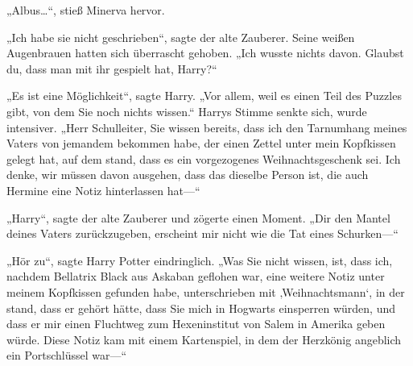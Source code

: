 „Albus…“, stieß Minerva hervor.

„Ich habe sie nicht geschrieben“, sagte der alte Zauberer. Seine weißen Augenbrauen hatten sich überrascht gehoben.
„Ich wusste nichts davon. Glaubst du, dass man mit ihr gespielt hat, Harry?“

„Es ist eine Möglichkeit“, sagte Harry.
„Vor allem, weil es einen Teil des Puzzles gibt, von dem Sie noch nichts wissen.“ Harrys Stimme senkte sich, wurde intensiver.
„Herr Schulleiter, Sie wissen bereits, dass ich den Tarnumhang meines Vaters von jemandem bekommen habe, der einen Zettel unter mein Kopfkissen gelegt hat, auf dem stand, dass es ein vorgezogenes Weihnachtsgeschenk sei. Ich denke, wir müssen davon ausgehen, dass das dieselbe Person ist, die auch Hermine eine Notiz hinterlassen hat—“

„Harry“, sagte der alte Zauberer und zögerte einen Moment.
„Dir den Mantel deines Vaters zurückzugeben, erscheint mir nicht wie die Tat eines Schurken—“

„Hör zu“, sagte Harry Potter eindringlich.
„Was Sie nicht wissen, ist, dass ich, nachdem Bellatrix Black aus Askaban geflohen war, eine weitere Notiz unter meinem Kopfkissen gefunden habe, unterschrieben mit ‚Weihnachtsmann‘, in der stand, dass er gehört hätte, dass Sie mich in Hogwarts einsperren würden, und dass er mir einen Fluchtweg zum Hexeninstitut von Salem in Amerika geben würde. Diese Notiz kam mit einem Kartenspiel, in dem der Herzkönig angeblich ein Portschlüssel war—“

